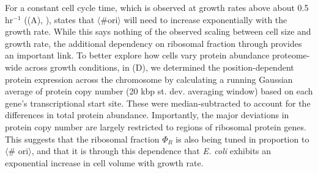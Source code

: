 For a constant cell cycle time, which is observed at growth rates above about
0.5 hr$^{-1}$ ((A), \citep{helmstetter1968}),
 states that $\langle \text{\# ori} \rangle$ will need to increase
exponentially with the growth rate. While this says nothing of the observed
scaling between cell size and growth rate, the additional dependency on
ribosomal fraction through  provides an
important link. To better explore how cells vary protein abundance proteome-wide
across growth conditions, in (D), we
determined the position-dependent protein expression across the chromosome by
calculating a running Gaussian average of protein copy number (20 kbp st. dev.
averaging window) based on each gene's transcriptional start site. These were
median-subtracted to account for the differences in total protein abundance.
Importantly, the major deviations in protein copy number are largely restricted to
regions of ribosomal protein genes. This suggests that the ribosomal fraction
$\Phi_R$ is also being tuned in proportion to $\langle$\# ori$\rangle$, and that
it is through this dependence that \textit{E. coli} exhibits an exponential
increase in cell volume with growth rate.

